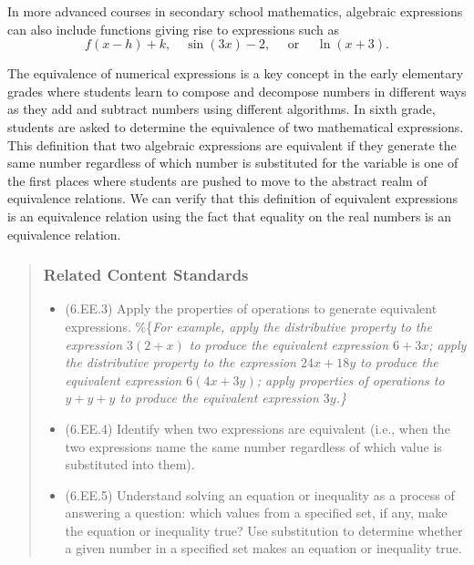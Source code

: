 \documentclass[
]{book}
\providecommand{\tightlist}{%
  \setlength{\itemsep}{0pt}\setlength{\parskip}{0pt}}
\theoremstyle{definition}
\theoremstyle{definition}
\theoremstyle{definition}
\theoremstyle{remark}
\begin{document}
In more advanced courses in secondary school mathematics, algebraic expressions can also include functions giving rise to expressions such as
\[f(x-h)+k, \quad \sin(3x)-2, \quad \mbox{ or } \quad  \ln(x+3).\]

The equivalence of numerical expressions is a key concept in the early elementary grades where students learn to compose and decompose numbers in different ways as they add and subtract numbers using different algorithms. In sixth grade, students are asked to determine the equivalence of two mathematical expressions. This definition that two algebraic expressions are equivalent if they generate the same number regardless of which number is substituted for the variable is one of the first places where students are pushed to move to the abstract realm of equivalence relations. We can verify that this definition of equivalent expressions is an equivalence relation using the fact that equality on the real numbers is an equivalence relation.

\begin{quote}
\hypertarget{related-content-standards-5}{%
\subsubsection*{Related Content Standards}\label{related-content-standards-5}}

\begin{itemize}
\tightlist
\item
  (6.EE.3) Apply the properties of operations to generate equivalent expressions. \%\{\em For example, apply the distributive property to the expression $3 (2 + x)$ to produce the equivalent expression $6 + 3x$; apply the distributive property to the expression $24x + 18y$ to produce the equivalent expression $6 (4x + 3y)$; apply properties of operations to $y + y + y$ to produce the equivalent expression $3y$.\}
\item
  (6.EE.4) Identify when two expressions are equivalent (i.e., when the two expressions name the same number regardless of which value is substituted into them).
\item
  (6.EE.5) Understand solving an equation or inequality as a process of answering a question: which values from a specified set, if any, make the equation or inequality true? Use substitution to determine whether a given number in a specified set makes an equation or inequality true.
\end{itemize}
\end{quote}
\end{document}
